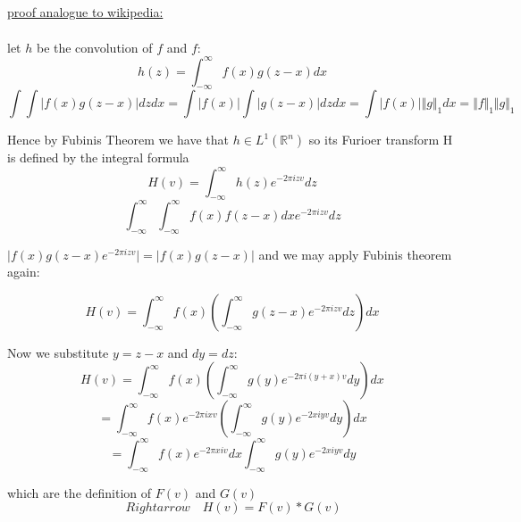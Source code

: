 \documentclass[12pt]{article}
\newcommand{\R}{\mathbb{R}}
\newcommand{\intinfty}{\int^{\infty}_{-\infty}}
\begin{document}

\setcounter{section}{9}
\setcounter{subsection}{0}


\subsection{ }


\subsection{ }

\underline{proof analogue to wikipedia:}\\\\

let $h$ be the convolution of $f$ and $f$:
$$ h(z) = \int^\infty_{-\infty} f(x)g(z-x) dx$$
$$\int \int \vert f(x)g(z-x) \vert dz dx = \int \vert f(x) \vert \int \vert g(z-x) \vert dz dx = \int \vert f(x) \vert \Vert g \Vert_1 dx = \Vert f \Vert_1 \Vert g \Vert_1$$

Hence by Fubinis Theorem we have that $h \in L^1(\R^n)$ so its Furioer transform H is defined by the integral formula
$$H(v) = \int^\infty_{-\infty} h(z)e^{-2 \pi i z v} dz$$
$$ \int^\infty_{-\infty} \int^\infty_{-\infty} f(x) f(z-x) dx e^{-2 \pi i z v} dz$$

$\vert f(x) g(z-x) e^{-2 \pi i z v} \vert = \vert f(x) g(z-x) \vert$ and we may apply Fubinis theorem again:

$$ H(v) = \int^\infty_{-\infty} f(x) (\int^\infty_{-\infty} g(z-x)e^{-2 \pi i z v} dz) dx$$

Now we substitute $y = z - x$ and $dy = dz$:
$$ H(v) = \intinfty f(x) ( \intinfty g(y)e^{-2 \pi i (y + x) v}dy)dx$$
$$ = \intinfty f(x) e ^{-2 \pi i x v} (\intinfty g(y) e ^{-2 x i y v}dy)dx$$
$$ = \intinfty f(x) e ^{-2 \pi x i v} dx \intinfty g(y)e^{-2 x i y v} dy$$

which are the definition of $F(v)$ and $G(v)$
$$ \ Rightarrow \quad H(v) = F(v) * G(v) $$




\subsection{ }



\end{document}
